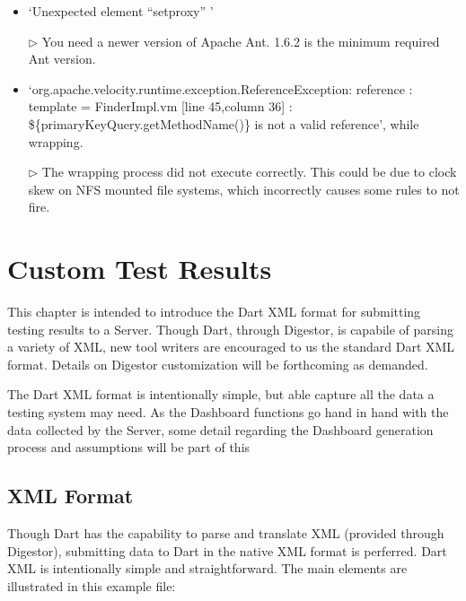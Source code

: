 \documentclass{InsightBook}
\newcommand{\answermark}{$\triangleright$ }
\begin{document}
\begin{itemize}
\item `Unexpected element ``setproxy'' '

  \answermark You need a newer version of Apache Ant. 1.6.2 is the minimum required Ant version.

\item `org.apache.velocity.runtime.exception.ReferenceException:
  reference : template = FinderImpl.vm [line 45,column 36] :
  \$\{primaryKeyQuery.getMethodName()\} is not a valid reference',
  while wrapping.

  \answermark The wrapping process did not execute correctly. This could be due to
  clock skew on NFS mounted file systems, which incorrectly causes some
  rules to not fire.

\end{itemize}




\chapter{Custom Test Results}
This chapter is intended to introduce the Dart XML format for
submitting testing results to a Server.  Though Dart, through
Digestor, is capabile of parsing a variety of XML, new tool writers
are encouraged to us the standard Dart XML format.  Details on
Digestor customization will be forthcoming as demanded.

The Dart XML format is intentionally simple, but able capture all the
data a testing system may need.  As the Dashboard functions go hand in
hand with the data collected by the Server, some detail regarding the
Dashboard generation process and assumptions will be part of this

\section{XML Format}
Though Dart has the capability to parse and translate XML (provided
through Digestor), submitting data to Dart in the native XML format is
 perferred.  Dart XML is intentionally simple and straightforward.
The main elements are illustrated in this example file:
\end{document}
